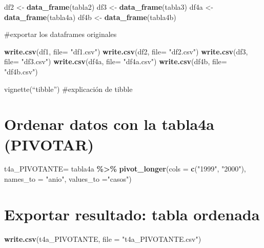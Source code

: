 \documentclass[
]{article}
\newenvironment{Shaded}{\begin{snugshade}}{\end{snugshade}}
\newcommand{\AttributeTok}[1]{\textcolor[rgb]{0.13,0.29,0.53}{#1}}
\newcommand{\FunctionTok}[1]{\textcolor[rgb]{0.13,0.29,0.53}{\textbf{#1}}}
\newcommand{\NormalTok}[1]{#1}
\newcommand{\OtherTok}[1]{\textcolor[rgb]{0.56,0.35,0.01}{#1}}
\newcommand{\SpecialCharTok}[1]{\textcolor[rgb]{0.81,0.36,0.00}{\textbf{#1}}}
\newcommand{\StringTok}[1]{\textcolor[rgb]{0.31,0.60,0.02}{#1}}
\begin{document}
\begin{Shaded}
\begin{Highlighting}[]
\NormalTok{df2 }\OtherTok{\textless{}{-}}  \FunctionTok{data\_frame}\NormalTok{(tabla2)}
\NormalTok{df3 }\OtherTok{\textless{}{-}}  \FunctionTok{data\_frame}\NormalTok{(tabla3)}
\NormalTok{df4a }\OtherTok{\textless{}{-}}  \FunctionTok{data\_frame}\NormalTok{(tabla4a)}
\NormalTok{df4b }\OtherTok{\textless{}{-}}  \FunctionTok{data\_frame}\NormalTok{(tabla4b)}
\end{Highlighting}
\end{Shaded}

\#exportar los dataframes originales

\begin{Shaded}
\begin{Highlighting}[]
\FunctionTok{write.csv}\NormalTok{(df1, }\AttributeTok{file=} \StringTok{"df1.csv"}\NormalTok{)}
\FunctionTok{write.csv}\NormalTok{(df2, }\AttributeTok{file=} \StringTok{"df2.csv"}\NormalTok{)}
\FunctionTok{write.csv}\NormalTok{(df3, }\AttributeTok{file=} \StringTok{"df3.csv"}\NormalTok{)}
\FunctionTok{write.csv}\NormalTok{(df4a, }\AttributeTok{file=} \StringTok{"df4a.csv"}\NormalTok{)}
\FunctionTok{write.csv}\NormalTok{(df4b, }\AttributeTok{file=} \StringTok{"df4b.csv"}\NormalTok{)}
\end{Highlighting}
\end{Shaded}

vignette(``tibble'') \#explicación de tibble

\section{Ordenar datos con la tabla4a
(PIVOTAR)}\label{ordenar-datos-con-la-tabla4a-pivotar}

\begin{Shaded}
\begin{Highlighting}[]
\NormalTok{t4a\_PIVOTANTE}\OtherTok{=}\NormalTok{ tabla4a }\SpecialCharTok{\%\textgreater{}\%} 
  \FunctionTok{pivot\_longer}\NormalTok{(}\AttributeTok{cols =} \FunctionTok{c}\NormalTok{(}\StringTok{"1999"}\NormalTok{, }\StringTok{"2000"}\NormalTok{), }\AttributeTok{names\_to =} \StringTok{"anio"}\NormalTok{, }\AttributeTok{values\_to =}\StringTok{"casos"}\NormalTok{) }
\end{Highlighting}
\end{Shaded}

\section{Exportar resultado: tabla
ordenada}\label{exportar-resultado-tabla-ordenada}

\begin{Shaded}
\begin{Highlighting}[]
\FunctionTok{write.csv}\NormalTok{(t4a\_PIVOTANTE, }\AttributeTok{file =} \StringTok{"t4a\_PIVOTANTE.csv"}\NormalTok{)}
\end{Highlighting}
\end{Shaded}
\end{document}
